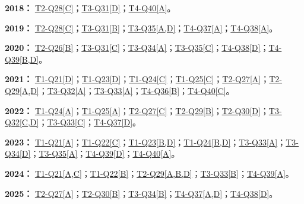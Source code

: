 \documentclass[11pt,a4paper]{article}
\begin{document}
\noindent\textbf{2018：} \hyperref[idx-2018-T2-Q28]{T2-Q28[C]}；\hyperref[idx-2018-T3-Q31]{T3-Q31[D]}；\hyperref[idx-2018-T4-Q40]{T4-Q40[A]}。\par\smallskip
\noindent\textbf{2019：} \hyperref[idx-2019-T2-Q28]{T2-Q28[C]}；\hyperref[idx-2019-T3-Q31]{T3-Q31[B]}；\hyperref[idx-2019-T3-Q35]{T3-Q35[A,D]}；\hyperref[idx-2019-T4-Q37]{T4-Q37[A]}；\hyperref[idx-2019-T4-Q38]{T4-Q38[A]}。\par\smallskip
\noindent\textbf{2020：} \hyperref[idx-2020-T2-Q26]{T2-Q26[B]}；\hyperref[idx-2020-T3-Q31]{T3-Q31[C]}；\hyperref[idx-2020-T3-Q34]{T3-Q34[A]}；\hyperref[idx-2020-T3-Q35]{T3-Q35[C]}；\hyperref[idx-2020-T4-Q38]{T4-Q38[D]}；\hyperref[idx-2020-T4-Q39]{T4-Q39[B,D]}。\par\smallskip
\noindent\textbf{2021：} \hyperref[idx-2021-T1-Q21]{T1-Q21[D]}；\hyperref[idx-2021-T1-Q23]{T1-Q23[D]}；\hyperref[idx-2021-T1-Q24]{T1-Q24[C]}；\hyperref[idx-2021-T1-Q25]{T1-Q25[C]}；\hyperref[idx-2021-T2-Q27]{T2-Q27[A]}；\hyperref[idx-2021-T2-Q29]{T2-Q29[A,D]}；\hyperref[idx-2021-T3-Q32]{T3-Q32[A]}；\hyperref[idx-2021-T3-Q33]{T3-Q33[A]}；\hyperref[idx-2021-T4-Q36]{T4-Q36[B]}；\hyperref[idx-2021-T4-Q40]{T4-Q40[C]}。\par\smallskip
\noindent\textbf{2022：} \hyperref[idx-2022-T1-Q24]{T1-Q24[A]}；\hyperref[idx-2022-T1-Q25]{T1-Q25[A]}；\hyperref[idx-2022-T2-Q27]{T2-Q27[C]}；\hyperref[idx-2022-T2-Q29]{T2-Q29[B]}；\hyperref[idx-2022-T2-Q30]{T2-Q30[D]}；\hyperref[idx-2022-T3-Q32]{T3-Q32[C,D]}；\hyperref[idx-2022-T3-Q33]{T3-Q33[C]}；\hyperref[idx-2022-T4-Q37]{T4-Q37[D]}。\par\smallskip
\noindent\textbf{2023：} \hyperref[idx-2023-T1-Q21]{T1-Q21[A]}；\hyperref[idx-2023-T1-Q22]{T1-Q22[C]}；\hyperref[idx-2023-T1-Q23]{T1-Q23[B,D]}；\hyperref[idx-2023-T1-Q24]{T1-Q24[B,D]}；\hyperref[idx-2023-T3-Q33]{T3-Q33[A]}；\hyperref[idx-2023-T3-Q34]{T3-Q34[D]}；\hyperref[idx-2023-T3-Q35]{T3-Q35[A]}；\hyperref[idx-2023-T4-Q39]{T4-Q39[D]}；\hyperref[idx-2023-T4-Q40]{T4-Q40[A]}。\par\smallskip
\noindent\textbf{2024：} \hyperref[idx-2024-T1-Q21]{T1-Q21[A,C]}；\hyperref[idx-2024-T1-Q22]{T1-Q22[B]}；\hyperref[idx-2024-T2-Q29]{T2-Q29[A,B,D]}；\hyperref[idx-2024-T3-Q33]{T3-Q33[B]}；\hyperref[idx-2024-T4-Q39]{T4-Q39[A]}。\par\smallskip
\noindent\textbf{2025：} \hyperref[idx-2025-T2-Q27]{T2-Q27[A]}；\hyperref[idx-2025-T2-Q30]{T2-Q30[B]}；\hyperref[idx-2025-T3-Q34]{T3-Q34[B]}；\hyperref[idx-2025-T4-Q37]{T4-Q37[A,D]}；\hyperref[idx-2025-T4-Q38]{T4-Q38[D]}。\par\smallskip
{}
\end{document}
